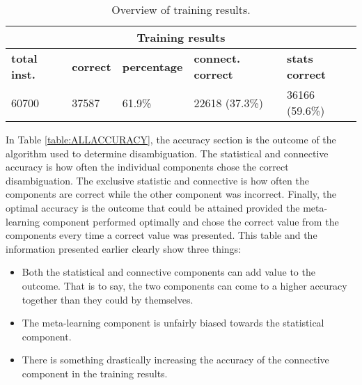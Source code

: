 \begin{table}[htp]
	\centering 
	\begin{tabular}{|l|l|l|l|l|}
		\hline
			\multicolumn{5}{|c|}{\bf Training results } \\
		\hline
		{\bf total inst.} & {\bf correct } & {\bf percentage} & {\bf connect. correct } & {\bf stats correct } \\ \hline 
		60700				  & 37587		   & 61.9\%		  & 22618 (37.3\%)				  & 36166 (59.6\%)   \\ \hline 
	\end{tabular}
	\caption{Overview of training results. \label{table:TRAININGRESULTS}}
\end{table}

In Table \ref{table:ALLACCURACY}, the accuracy section is the outcome of the
algorithm used to determine disambiguation. The statistical and connective
accuracy is how often the individual components chose the correct
disambiguation.  The exclusive statistic and connective is how often the
components are correct while the other component was incorrect.  Finally, the
optimal accuracy is the outcome that could be attained provided the meta-learning component performed optimally and chose the correct value from the
components every time a correct value was presented. This table and the
information presented earlier clearly show three things: 
\begin{itemize}
	\item Both the statistical and connective components can add value to the 
	outcome. That is to say, the two components can come to a higher accuracy 
	together than they could by themselves.     
	\item The meta-learning component is unfairly biased towards the statistical
	component.     
	\item There is something drastically increasing the accuracy of the connective component in the training results. 
\end{itemize}

